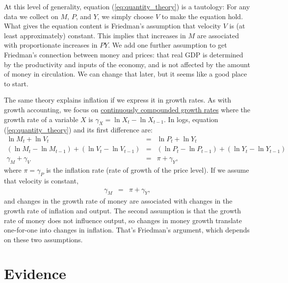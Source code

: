 At this level of generality,
equation (\ref{eq:quantity_theory}) is a tautology:
For any data we collect on $M$, $P$, and $Y$,
we simply choose $V$ to make the equation hold.
What gives the equation content is Friedman's
assumption that velocity $V$ is (at least approximately)
constant.  This implies that increases in $M$ are associated with
proportionate increases in $PY$.
We add one further assumption to get Friedman's connection between
money and prices:
that real GDP is determined by the productivity and inputs of the economy,
and is not affected by the amount of money in circulation.
We can change that later, but it seems like a good place to start.


The same theory explains inflation if we express it in growth rates.
As with growth accounting, we focus on \hyperref[sec:growth_math_cc]{continuously compounded growth rates} where the growth rate of a variable $X$ is
$ \gamma_X = \ln X_t - \ln X_{t-1}$.
In logs, equation (\ref{eq:quantity_theory}) and its first difference are:
%
\begin{eqnarray*}
    \ln M_t + \ln V_t &=& \ln P_t + \ln Y_t \\
    (\ln M_t - \ln M_{t-1})  + (\ln V_t - \ln V_{t-1})
                 &=& (\ln P_t - \ln P_{t-1}) + (\ln Y_t - \ln Y_{t-1})\\
    \gamma_M  + \gamma_V &=&  \pi + \gamma_Y ,
\end{eqnarray*}
%
where $\pi = \gamma_P $ is the inflation rate
(rate of growth of the price level).
If we assume that velocity is constant,
\begin{eqnarray}
    \gamma_M   &=&  \pi + \gamma_Y ,
    \label{eq:quantity_theory-growth}
\end{eqnarray}
and changes in the growth rate of money are associated
with changes in the growth rate of inflation and output.
The second assumption is that the growth rate of money does not influence
output, so changes in money growth translate one-for-one
into changes in inflation.
That's Friedman's argument, which depends on these two assumptions.


\section{Evidence}

